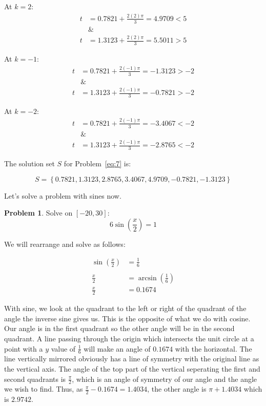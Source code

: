 \documentclass[12pt]{article}
\theoremstyle{definition}
\newtheorem{problem}{Problem}
\begin{document}
At $k=2$:
\begin{align}
    t & = 0.7821 + \frac{2(2)\pi}{3} = 4.9709 < 5 \\
      & \&                                        \\
    t & = 1.3123 + \frac{2(2)\pi}{3} = 5.5011 > 5
\end{align}

At $k=-1$:
\begin{align}
    t & = 0.7821 + \frac{2(-1)\pi}{3} = -1.3123 > -2 \\
      & \&                                           \\
    t & = 1.3123 + \frac{2(-1)\pi}{3} = -0.7821 > -2
\end{align}

At $k=-2$:
\begin{align}
    t & = 0.7821 + \frac{2(-1)\pi}{3} = -3.4067 < -2 \\
      & \&                                           \\
    t & = 1.3123 + \frac{2(-1)\pi}{3} = -2.8765 < -2
\end{align}

The solution set $S$ for Problem~\eqref{eq:7} is:

\begin{equation}
    S = \left\{ 0.7821, 1.3123, 2.8765, 3.4067, 4.9709, -0.7821, -1.3123 \right\}
\end{equation}

Let's solve a problem with sines now.

\begin{problem}
Solve on $[-20, 30]$:
\begin{equation*}
    6\sin\left(\frac{x}{2}\right) = 1 \label{eq:8}
\end{equation*}
\end{problem}

We will rearrange and solve as follows:

\begin{align}
    \sin\left(\frac{x}{2}\right) & = \frac{1}{6}                     \\
    \nonumber                                                        \\
    \frac{x}{2}                  & = \arcsin\left(\frac{1}{6}\right) \\
    \frac{x}{2}                  & = 0.1674
\end{align}

With sine, we look at the quadrant to the left or right of the quadrant of the angle the inverse sine gives us.
This is the opposite of what we do with cosine.
Our angle is in the first quadrant so the other angle will be in the second quadrant.
A line passing through the origin which intersects the unit circle at a point with a $y$ value of $\frac{1}{6}$ will make an angle of $0.1674$ with the horizontal.
The line vertically mirrored obviously has a line of symmetry with the original line as the vertical axis.
The angle of the top part of the vertical seperating the first and second quadrants is $\frac{\pi}{2}$, which is an angle of symmetry of our angle and the angle we wish to find.
Thus, as $\frac{\pi}{2}-0.1674=1.4034$, the other angle is $\pi+1.4034$ which is $2.9742$.
\end{document}
